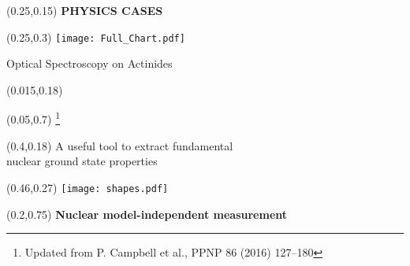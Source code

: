 \documentclass[10pt,aspectratio=169]{beamer}
\begin{document}
\begin{SectionTitle}
\begin{frame}
	\centering
	\begin{textblock*}{0.5\paperwidth}(0.25\paperwidth,0.15\paperheight)
		\centering
		\textbf{\LARGE PHYSICS CASES}	
	\end{textblock*}
	\begin{textblock*}{0.5\paperwidth}(0.25\paperwidth,0.3\paperheight)
        \texttt{[image: Full\_Chart.pdf]}
	\end{textblock*}

\end{frame}
\end{SectionTitle}

\begin{frame}{Optical Spectroscopy on Actinides}
	\begin{textblock*}{0.5\paperwidth}(0.015\paperwidth,0.18\paperheight)
		\begin{textblock*}{0.1\paperwidth}(0.05\paperwidth,0.7\paperheight)
			\footnote{Updated from P. Campbell et al., PPNP 86 (2016) 127–180}
		\end{textblock*}
	\end{textblock*}
	\begin{textblock*}{0.6\paperwidth}(0.4\paperwidth,0.18\paperheight)
		\centering
		A useful tool to extract fundamental \\nuclear ground state properties
	\end{textblock*}
	\begin{textblock*}{0.3\paperwidth}(0.46\paperwidth,0.27\paperheight)
		\texttt{[image: shapes.pdf]}
	\end{textblock*}
	\begin{textblock*}{0.5\paperwidth}(0.2\paperwidth,0.75\paperheight)
		\textbf{Nuclear model-independent measurement} 
	\end{textblock*}
\end{frame}
\end{document}
